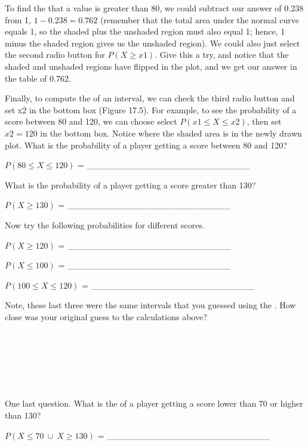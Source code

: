 \documentclass[
  openany]{krantz}
\begin{document}
To find the  that a value is greater than 80, we could subtract our answer of 0.238 from 1, \(1 - 0.238 = 0.762\) (remember that the total area under the normal curve equals 1, so the shaded plus the unshaded region must also equal 1; hence, 1 minus the shaded region gives us the unshaded region).
We could also just select the second radio button for \(P(X \geq x1)\).
Give this a try, and notice that the shaded and unshaded regions have flipped in the plot, and we get our answer in the table of 0.762.

Finally, to compute the  of an interval, we can check the third radio button and set x2 in the bottom box (Figure 17.5).
For example, to see the probability of a score between 80 and 120, we can choose select \(P(x1 \leq X \leq x2)\), then set \(x2 = 120\) in the bottom box.
Notice where the shaded area is in the newly drawn plot.
What is the probability of a player getting a score between 80 and 120?

\(P(80 \leq X \leq 120)\) = \_\_\_\_\_\_\_\_\_\_\_\_\_\_\_\_\_\_\_\_\_\_\_\_\_\_

What is the probability of a player getting a score greater than 130?

\(P(X \geq 130)\) = \_\_\_\_\_\_\_\_\_\_\_\_\_\_\_\_\_\_\_\_\_\_\_\_\_\_

Now try the following probabilities for different scores.

\(P(X \geq 120)\) = \_\_\_\_\_\_\_\_\_\_\_\_\_\_\_\_\_\_\_\_\_\_\_\_\_\_

\(P(X \leq 100)\) = \_\_\_\_\_\_\_\_\_\_\_\_\_\_\_\_\_\_\_\_\_\_\_\_\_\_

\(P(100 \leq X \leq 120)\) = \_\_\_\_\_\_\_\_\_\_\_\_\_\_\_\_\_\_\_\_\_\_\_\_\_\_

Note, these last three were the same intervals that you guessed using the .
How close was your original guess to the calculations above?

\begin{verbatim}






\end{verbatim}

One last question.
What is the  of a player getting a score lower than 70 or higher than 130?

\(P(X \leq 70 \: \cup \: X \geq 130)\) = \_\_\_\_\_\_\_\_\_\_\_\_\_\_\_\_\_\_\_\_\_\_\_\_\_\_
\end{document}
